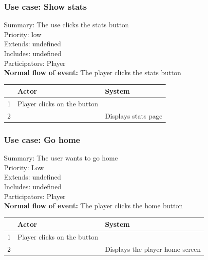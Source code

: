 \documentclass{article}
\begin{document}
\subsubsection{Use case: Show stats}
Summary: The use clicks the stats button\\
Priority: low\\
Extends: undefined\\
Includes: undefined\\
Participators: Player\\
\textbf{Normal flow of event:} The player clicks the stats button
\vspace{1 mm}\\
\begin{tabular}{|c|l|l|} \hline
      & Actor & System \\ \hline
    1 & Player clicks on the button & \\ \hline
    2 & & Displays stats page \\ \hline
\end{tabular} 
\vspace{5 mm}
\subsubsection{Use case: Go home}
Summary: The user wants to go home\\
Priority: Low \\
Extends: undefined\\
Includes: undefined\\
Participators: Player \\
\textbf{Normal flow of event:} The player clicks the home button
\vspace{1 mm}\\
\begin{tabular}{|c|l|l|} \hline
      & Actor & System \\ \hline
    1 & Player clicks on the button & \\ \hline
    2 & & Displays the player home screen \\ \hline
\end{tabular} 
\vspace{5 mm}
\end{document}

